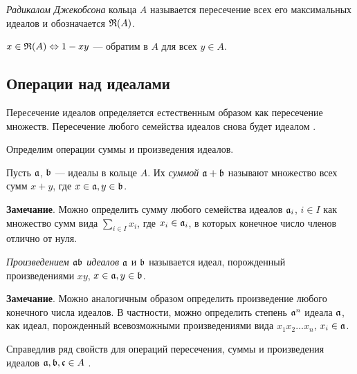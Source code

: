    \begin{Def}
        \textit{Радикалом Джекобсона} кольца $A$ называется пересечение всех его максимальных идеалов и обозначается $\mathfrak{R}(A)$.
    \end{Def}

    \begin{Theorem}\label{jac_prop} \cite{A-M}
        $x \in \mathfrak{R}(A) \Leftrightarrow 1 - xy$ --- обратим в $A$ для всех $y \in A$.
    \end{Theorem}

    \subsection{Операции над идеалами}

    Пересечение идеалов определяется естественным образом как пересечение множеств. Пересечение любого семейства идеалов снова будет идеалом \cite{A-M}.

    Определим операции суммы и произведения идеалов.

    \begin{Def}
        Пусть $\mathfrak{a}$, $\mathfrak{b}$ --- идеалы в кольце $A$. Их \textit{суммой $\mathfrak{a} + \mathfrak{b}$} называют множество всех сумм $x + y$, где
        $x \in \mathfrak{a}, y \in \mathfrak{b}$.
    \end{Def}

    \noindent
    \textbf{Замечание}. Можно определить сумму любого семейства идеалов $\mathfrak{a}_i$, $i \in I$ как множество сумм вида $\sum_{i \in I} x_i$, где $x_i \in \mathfrak{a}_i$, 
    в которых конечное число членов отлично от нуля.

    \begin{Def}
        \textit{Произведением $\mathfrak{ab}$ идеалов} $\mathfrak{a}$ и $\mathfrak{b}$ называется идеал, порожденный произведениями $xy$, $x \in \mathfrak{a}, y \in \mathfrak{b}$.
    \end{Def}

    \noindent
    \textbf{Замечание}. Можно аналогичным образом определить произведение любого конечного числа идеалов. В частности, можно определить степень $\mathfrak{a}^n$ идеала $\mathfrak{a}$, как идеал,
    порожденный всевозможными произведениями вида $x_1x_2\dots x_n$, $x_i \in \mathfrak{a}$.

    Справедлив ряд свойств для операций пересечения, суммы и произведения идеалов $\mathfrak{a, b, c} \in A$ \cite{A-M}.

